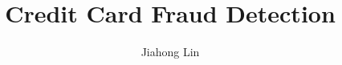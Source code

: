\documentclass{amsart}
\begin{document}
%
%
\title[Credit Card Fraud Detection]{Credit Card Fraud Detection}%

\author{Jiahong Lin}
\address[A.~1]{School of Economics and Management,\\ 
Nanjing University of Science and Technology, China}%



%
\date{\gitAuthorDate}%




\maketitle
\tableofcontents

\newpage



\newpage
%
%
\end{document}
